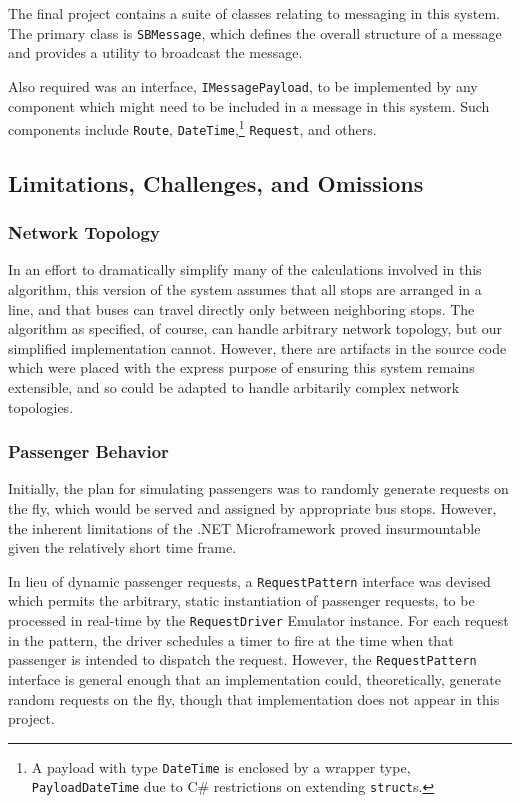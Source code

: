\documentclass[runningheads]{llncs}
\begin{document}
The final project contains a suite of classes relating to messaging in this system. The primary class is \lstinline{SBMessage}, which defines the overall structure of a message and provides a utility to broadcast the message.

Also required was an interface, \lstinline{IMessagePayload}, to be implemented by any component which might need to be included in a message in this system. Such components include \lstinline{Route}, \lstinline{DateTime},\footnote{A payload with type \lstinline|DateTime| is enclosed by a wrapper type, \lstinline|PayloadDateTime| due to C\# restrictions on extending \lstinline|struct|s.} \lstinline{Request}, and others.


\subsection{Limitations, Challenges, and Omissions}
\subsubsection{Network Topology}
In an effort to dramatically simplify many of the calculations involved in this algorithm, this version of the system assumes that all stops are arranged in a line, and that buses can travel directly only between neighboring stops. The algorithm as specified, of course, can handle arbitrary network topology, but our simplified implementation cannot. However, there are artifacts in the source code which were placed with the express purpose of ensuring this system remains extensible, and so could be adapted to handle arbitarily complex network topologies.

\subsubsection{Passenger Behavior}
\label{sub:passengers}
Initially, the plan for simulating passengers was to randomly generate requests on the fly, which would be served and assigned by appropriate bus stops. However, the inherent limitations of the .NET Microframework proved insurmountable given the relatively short time frame.

In lieu of dynamic passenger requests, a \lstinline{RequestPattern} interface was devised which permits the arbitrary, static instantiation of passenger requests, to be processed in real-time by the \lstinline{RequestDriver} Emulator instance. For each request in the pattern, the driver schedules a timer to fire at the time when that passenger is intended to dispatch the request. However, the \lstinline{RequestPattern} interface is general enough that an implementation could, theoretically, generate random requests on the fly, though that implementation does not appear in this project.
\end{document}
